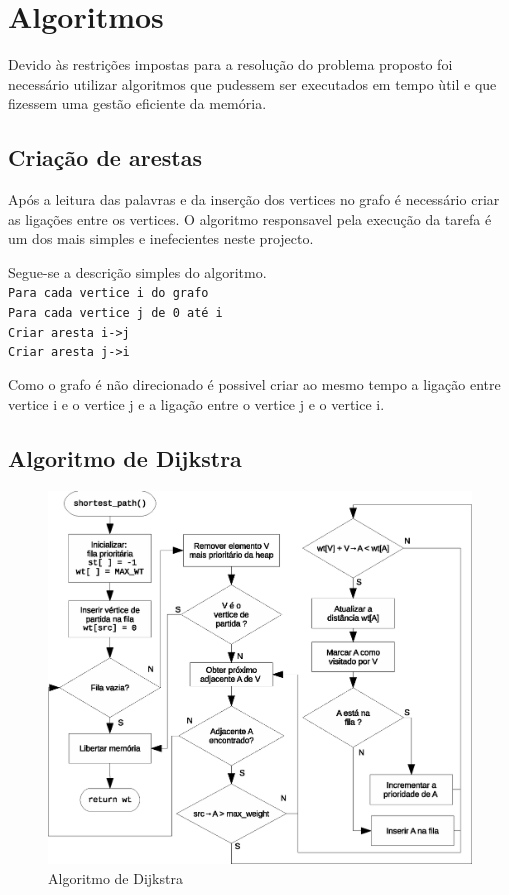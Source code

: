 \documentclass[a4paper, 18pt]{article}
\begin{document}
\section{Algoritmos}
	\par
	Devido às restrições impostas para a resolução do problema proposto foi 
necessário utilizar algoritmos que pudessem ser executados em tempo ùtil e que 
fizessem uma gestão eficiente da memória.


\subsection{Criação de arestas}
	\par
	Após a leitura das palavras e da inserção dos vertices no grafo é 
necessário criar as ligações entre os vertices. O algoritmo responsavel pela 
execução da tarefa é um dos mais simples e inefecientes neste projecto.
	\par
	Segue-se a descrição simples do algoritmo.\\
	
	
	\texttt{Para cada vertice i do grafo}\\
	\indent\indent\texttt{Para cada vertice j de 0 até i}\\
	\indent\indent\indent\texttt{Criar aresta i->j}\\
	\indent\indent\indent\texttt{Criar aresta j->i}\\
	
	\par
	Como o grafo é não direcionado é possivel criar ao mesmo tempo a ligação 
entre vertice i e o vertice j e a ligação entre o vertice j e o vertice i.
	
	
\subsection{Algoritmo de Dijkstra}
\label{sec:alg_dijkstra}
	\begin{figure}[H]
		\centering
		\label{fig:dijkstra}
		\includegraphics[width=0.85\linewidth]{dijkstra}
		\caption{Algoritmo de Dijkstra}
	\end{figure}
\end{document}
